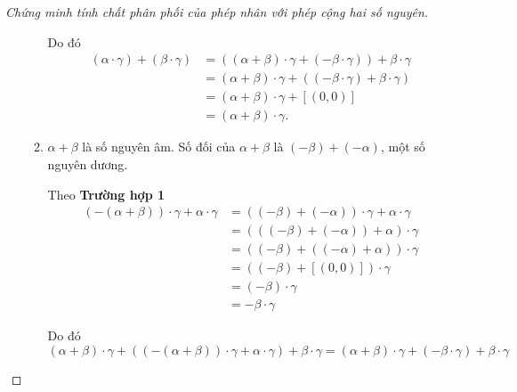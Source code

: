 \begin{proof}[Chứng minh tính chất phân phối của phép nhân với phép cộng hai số nguyên]
\begin{enumerate}[label={\textbf{Trường hợp \arabic*.}},itemindent=1.7cm]
\begin{enumerate}[label={\textbf{\alph*.}}]
			            Do đó
			            \begin{align*}
				            (\alpha\cdot\gamma) + (\beta\cdot\gamma) & = ((\alpha + \beta)\cdot\gamma + (-\beta\cdot\gamma)) + \beta\cdot\gamma \\
				                                                     & = (\alpha + \beta)\cdot\gamma + ((-\beta\cdot\gamma) + \beta\cdot\gamma) \\
				                                                     & = (\alpha + \beta)\cdot\gamma + [(0,0)]                                  \\
				                                                     & = (\alpha + \beta)\cdot\gamma.
			            \end{align*}
			      \item $\alpha + \beta$ là số nguyên âm. Số đối của $\alpha + \beta$ là $(-\beta) + (-\alpha)$, một số nguyên dương.

			            Theo \textbf{Trường hợp 1}
			            \begin{align*}
				            (-(\alpha + \beta))\cdot\gamma + \alpha\cdot\gamma & = ((-\beta) + (-\alpha))\cdot\gamma + \alpha\cdot\gamma \\
				                                                               & = (((-\beta) + (-\alpha)) + \alpha)\cdot\gamma          \\
				                                                               & = ((-\beta) + ((-\alpha) + \alpha))\cdot\gamma          \\
				                                                               & = ((-\beta) + [(0, 0)])\cdot\gamma                      \\
				                                                               & = (-\beta)\cdot\gamma                                   \\
				                                                               & = -\beta\cdot\gamma
			            \end{align*}

			            Do đó
			            \[
				            (\alpha + \beta)\cdot\gamma + ((-(\alpha + \beta))\cdot\gamma + \alpha\cdot\gamma) + \beta\cdot\gamma = (\alpha + \beta)\cdot\gamma + (-\beta\cdot\gamma) + \beta\cdot\gamma
			            \]


\end{enumerate}
\end{enumerate}
\end{proof}
